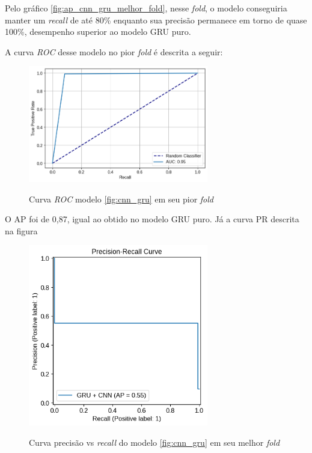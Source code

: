 Pelo gráfico \ref{fig:ap_cnn_gru_melhor_fold}, nesse \textit{fold}, o modelo conseguiria manter um \textit{recall} de até 80\%
enquanto sua precisão permanece em torno de quase 100\%, desempenho superior ao modelo GRU puro.

A curva \textit{ROC} desse modelo no pior \textit{fold} é descrita a seguir:

\begin{figure}[H]
  \centering
  \caption{Curva \textit{ROC} modelo \ref{fig:cnn_gru} em seu pior \textit{fold}}
   \includegraphics[width=0.7\textwidth]{figuras/modelos_resultados/gru_cnn/roc_cnn_pior_fold_3.png} 
  \label{fig:roc_cnn_gru_pior_fold}
\end{figure}

O AP foi de 0,87, igual ao obtido no modelo GRU puro. Já a curva PR descrita na figura

\begin{figure}[H]
  \centering
  \caption{Curva precisão vs \textit{recall} do modelo \ref{fig:cnn_gru} em seu melhor \textit{fold}}
   \includegraphics[width=0.7\textwidth]{figuras/modelos_resultados/gru_cnn/ap_gru_cnn_pior_fold_3.png} 
  \label{fig:ap_cnn_gru_pior_fold}
\end{figure}

